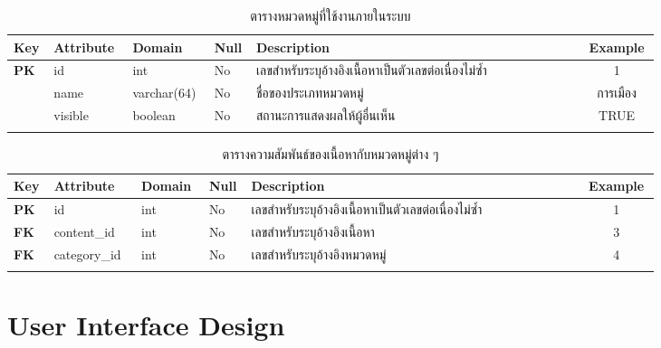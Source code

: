 \documentclass[12pt,oneside,openright,a4paper]{cpe-thai-project}
\begin{document}
\begin{itemize}
\begin{longtable}{p{0.03\linewidth}|p{0.1\linewidth}|p{0.1\linewidth}|m{0.03\linewidth}|p{0.47\linewidth}|p{0.1\linewidth}}
  \caption{ตารางหมวดหมู่ที่ใช้งานภายในระบบ}\label{tbl:categories}  \\
  \hhline{======}
  \textbf{Key} & \textbf{Attribute} & \textbf{Domain} & \textbf{Null} & \textbf{Description} &\multicolumn{1}{c}{\textbf{Example}}  \\ \hline
  \endfirsthead
  \endhead
  \textbf{PK} & id      & int         & No & เลขสำหรับระบุอ้างอิงเนื้อหาเป็นตัวเลขต่อเนื่องไม่ซ้ำ      & \multicolumn{1}{c}{1}          \\ \hline
  \textbf{}   & name    & varchar(64) & No & ชื่อของประเภทหมวดหมู่                          & \multicolumn{1}{c}{การเมือง}     \\ \hline
  \textbf{}   & visible & boolean     & No & สถานะการแสดงผลให้ผู้อื่นเห็น                     & \multicolumn{1}{c}{TRUE}        \\ \hhline{======}
\end{longtable}

\begin{longtable}{p{0.03\linewidth}|p{0.12\linewidth}|p{0.08\linewidth}|m{0.03\linewidth}|p{0.47\linewidth}|p{0.1\linewidth}}
  \caption{ตารางความสัมพันธ์ของเนื้อหากับหมวดหมู่ต่าง ๆ}\label{tbl:content_categories}  \\
  \hhline{======}
  \textbf{Key} & \textbf{Attribute} & \textbf{Domain} & \textbf{Null} & \textbf{Description} &\multicolumn{1}{c}{\textbf{Example}}  \\ \hline
  \endfirsthead
  \endhead
  \textbf{PK} & id      & int         & No & เลขสำหรับระบุอ้างอิงเนื้อหาเป็นตัวเลขต่อเนื่องไม่ซ้ำ      & \multicolumn{1}{c}{1}          \\ \hline
  \textbf{FK}   & content\_id    & int & No & เลขสำหรับระบุอ้างอิงเนื้อหา                          & \multicolumn{1}{c}{3}     \\ \hline
  \textbf{FK}   & category\_id & int     & No & เลขสำหรับระบุอ้างอิงหมวดหมู่                     & \multicolumn{1}{c}{4}        \\ \hhline{======}
\end{longtable}

\section{User Interface Design}

\end{itemize}
\end{document}
